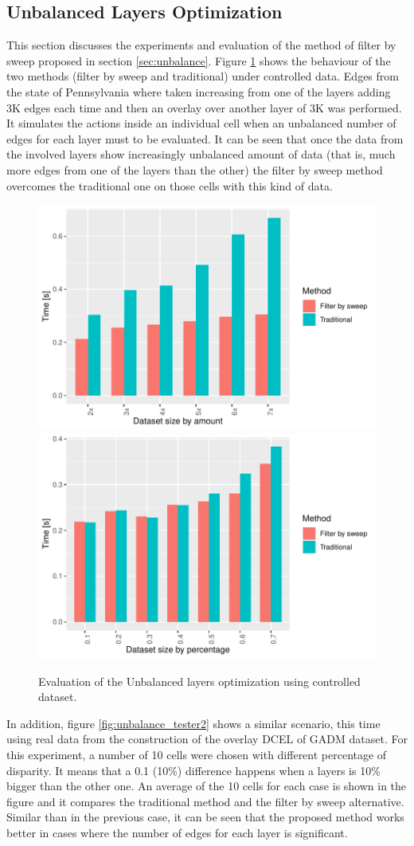 \subsection{Unbalanced Layers Optimization}

This section discusses the experiments and evaluation of the method of filter by sweep proposed in section \ref{sec:unbalance}. Figure \ref{fig:unbalance_tester1} shows the behaviour of the two methods (filter by sweep and traditional) under controlled data.  Edges from the state of Pennsylvania where taken increasing from one of the layers adding 3K edges each time and then an overlay over another layer of 3K was performed.  It simulates the actions inside an individual cell when an unbalanced number of edges for each layer must to be evaluated. It can be seen that once the data from the involved layers show increasingly unbalanced amount of data (that is, much more edges from one of the layers than the other) the filter by sweep method overcomes the traditional one on those cells with this kind of data.

\begin{figure}
    \centering
    \includegraphics[width=0.35\linewidth]{figures/experiments/Unbalance_Tester01.pdf}
    \includegraphics[width=0.35\linewidth]{figures/experiments/Unbalance_Tester02.pdf}
    \caption{Evaluation of the Unbalanced layers optimization using controlled dataset.}\label{fig:unbalance_tester1}
\end{figure}

In addition, figure \ref{fig:unbalance_tester2} shows a similar scenario, this time using real data from the construction of the overlay DCEL of GADM dataset. For this experiment, a number of 10 cells were chosen with different percentage of disparity. It means that a 0.1 (10\%) difference happens when a layers is 10\% bigger than the other one. An average of the 10 cells for each case is shown in the figure and it compares the traditional method and the filter by sweep alternative.  Similar than in the previous case, it can be seen that the proposed method works better in cases where the number of edges for each layer is significant.

